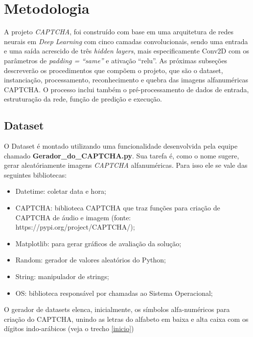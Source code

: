 \section{Metodologia}

A projeto \textit{CAPTCHA}, foi construído com base em uma arquitetura de redes neurais em \textit{Deep Learning} com cinco camadas convolucionais, sendo uma entrada e uma saída acrescido de três \textit{hidden layers}, mais especificamente Conv2D com os parâmetros de \textit{padding = ``same''} e ativação ``relu''. As próximas subseções descreverão os procedimentos que compõem o projeto, que são o dataset, instanciação, processamento, reconhecimento e quebra das imagens alfanuméricas CAPTCHA. O processo inclui também o pré-processamento de dados de entrada, estruturação da rede, função de predição e execução.

\subsection{Dataset}

O Dataset é montado utilizando uma funcionalidade desenvolvida pela equipe chamado \textbf{Gerador\_do\_CAPTCHA.py}. Sua tarefa é, como o nome sugere, gerar aleatóriamente imagens \textit{CAPTCHA} alfanuméricas. Para isso ele se vale das seguintes bibliotecas:

\begin{itemize}
    \item Datetime: coletar data e hora;
    \item CAPTCHA: biblioteca CAPTCHA que traz funções para criação de CAPTCHA de áudio e imagem (fonte: https://pypi.org/project/CAPTCHA/);
    \item Matplotlib: para gerar gráficos de avaliação da solução;
    \item Random: gerador de valores aleatórios do Python;
    \item String: manipulador de strings;
    \item OS: biblioteca responsável por chamadas ao Sistema Operacional;
\end{itemize}

O gerador de datasets elenca, inicialmente, os símbolos alfa-numéricos para criação do CAPTCHA, unindo as letras do alfabeto em baixa e alta caixa com os dígitos indo-arábicos (veja o trecho \ref{inicio})



